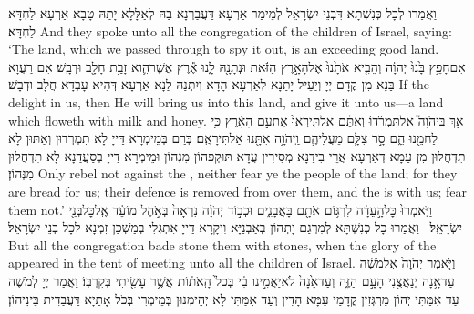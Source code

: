 {וַאֲמַרוּ לְכָל כְּנִשְׁתָּא דִּבְנֵי יִשְׂרָאֵל לְמֵימַר אַרְעָא דַּעֲבַרְנָא בַהּ לְאַלָּלָא יָתַהּ טָבָא אַרְעָא לַחְדָּא לַחְדָּא׃}
{And they spoke unto all the congregation of the children of Israel, saying: ‘The land, which we passed through to spy it out, is an exceeding good land.}{}
{אִם\maqqaf חָפֵ֥ץ בָּ֙נוּ֙ יְהֹוָ֔ה וְהֵבִ֤יא אֹתָ֙נוּ֙ אֶל\maqqaf הָאָ֣רֶץ הַזֹּ֔את וּנְתָנָ֖הּ לָ֑נוּ אֶ֕רֶץ אֲשֶׁר\maqqaf הִ֛וא זָבַ֥ת חָלָ֖ב וּדְבָֽשׁ׃}
{אִם רַעֲוָא בַּנָא מִן קֳדָם יְיָ וְיַעֵיל יָתַנָא לְאַרְעָא הָדָא וְיִתְּנַהּ לַנָא אַרְעָא דְּהִיא עָבְדָא חֲלָב וּדְבָשׁ׃}
{If the \lord\space delight in us, then He will bring us into this land, and give it unto us—a land which floweth with milk and honey.}{}
{אַ֣ךְ בַּיהֹוָה֮ אַל\maqqaf תִּמְרֹ֒דוּ֒ וְאַתֶּ֗ם אַל\maqqaf תִּֽירְאוּ֙ אֶת\maqqaf עַ֣ם הָאָ֔רֶץ כִּ֥י לַחְמֵ֖נוּ הֵ֑ם סָ֣ר צִלָּ֧ם מֵעֲלֵיהֶ֛ם וַֽיהֹוָ֥ה אִתָּ֖נוּ אַל\maqqaf תִּירָאֻֽם׃}
{בְּרַם בְּמֵימְרָא דַּייָ לָא תִמְרְדוּן וְאַתּוּן לָא תִדְחֲלוּן מִן עַמָּא דְּאַרְעָא אֲרֵי בִידַנָא מְסִירִין עֲדָא תּוּקְפְהוֹן מִנְּהוֹן וּמֵימְרָא דַּייָ בְּסַעֲדַנָא לָא תִדְחֲלוּן מִנְּהוֹן׃}
{Only rebel not against the \lord, neither fear ye the people of the land; for they are bread for us; their defence is removed from over them, and the \lord\space is with us; fear them not.’}{}
{וַיֹּֽאמְרוּ֙ כׇּל\maqqaf הָ֣עֵדָ֔ה לִרְגּ֥וֹם אֹתָ֖ם בָּאֲבָנִ֑ים וּכְב֣וֹד יְהֹוָ֗ה נִרְאָה֙ בְּאֹ֣הֶל מוֹעֵ֔ד אֶֽל\maqqaf כׇּל\maqqaf בְּנֵ֖י יִשְׂרָאֵֽל׃ \petucha }
{וַאֲמַרוּ כָּל כְּנִשְׁתָּא לְמִרְגַּם יָתְהוֹן בְּאַבְנַיָּא וִיקָרָא דַּייָ אִתְגְּלִי בְּמַשְׁכַּן זִמְנָא לְכָל בְּנֵי יִשְׂרָאֵל׃}
{But all the congregation bade stone them with stones, when the glory of the \lord\space appeared in the tent of meeting unto all the children of Israel.}{}
{וַיֹּ֤אמֶר יְהֹוָה֙ אֶל\maqqaf מֹשֶׁ֔ה עַד\maqqaf אָ֥נָה יְנַאֲצֻ֖נִי הָעָ֣ם הַזֶּ֑ה וְעַד\maqqaf אָ֙נָה֙ לֹא\maqqaf יַאֲמִ֣ינוּ בִ֔י בְּכֹל֙ הָֽאֹת֔וֹת אֲשֶׁ֥ר עָשִׂ֖יתִי בְּקִרְבּֽוֹ׃}
{וַאֲמַר יְיָ לְמֹשֶׁה עַד אִמַּתִּי יְהוֹן מַרְגְּזִין קֳדָמַי עַמָּא הָדֵין וְעַד אִמַּתִּי לָא יְהֵימְנוּן בְּמֵימְרִי בְּכֹל אָתַיָּא דַּעֲבַדִית בֵּינֵיהוֹן׃}
